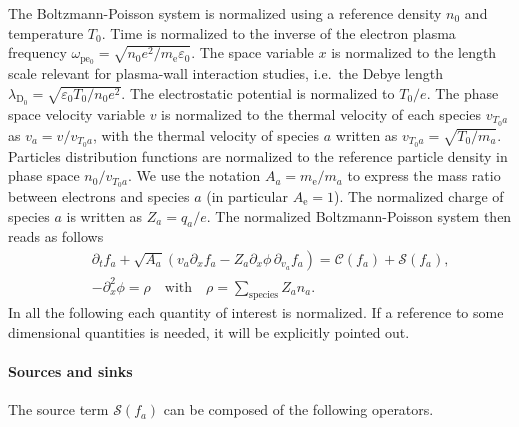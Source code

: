 \documentclass[11pt]{article}
\begin{document}
\noindent The Boltzmann-Poisson system is normalized using a reference density $n_0$ and temperature $T_0$. Time is normalized to the inverse of the electron plasma frequency $\omega_{\mathrm{pe_0}} = \sqrt{n_0 e^2 / m_\mathrm{e}\varepsilon_0} $. The space variable $x$ is normalized to the length scale relevant for plasma-wall interaction studies, i.e.\ the Debye length $\lambda_{\mathrm{D}_0} = \sqrt{\varepsilon_0 T_0 / n_0 e^2} $. The electrostatic potential is normalized to $T_0 / e$. The phase space velocity variable $v$ is normalized to the thermal velocity of each species $v_{T_0a}$ as $v_a = v/v_{T_0 a}$, with the thermal velocity of species $a$ written as $v_{T_0a} =  \sqrt{T_0/m_a}$. Particles distribution functions are normalized to the reference particle density in phase space $n_0 / v_{T_0a}$. We use the notation $A_a = m_\mathrm{e} / m_a$ to express the mass ratio between electrons and species $a$ (in particular $A_\mathrm{e} = 1$). The normalized charge of species $a$ is written as  $Z_a = q_a / e$. The normalized Boltzmann-Poisson system then reads as follows
%
\begin{eqnarray}
  && \partial_{t} f_a + \sqrt{A_a} \left( v_a \partial_{x} f_a \right. - \left. Z_a \partial_{x} \phi \, \partial_{v_a} f_a \right)   = \mathcal{C}(f_a) + \mathcal{S}(f_a), \label{eq:boltzmann_norm} \\[0.2cm]
  && -\partial_{x}^2 \phi = \rho \quad \text{with} \quad \rho = \sum\limits_{\mathrm{species}}^{} Z_a n_a. \label{eq:poisson_norm}
\end{eqnarray}
%
In all the following each quantity of interest is normalized. If a reference to some dimensional quantities is needed, it will be explicitly pointed out.
%
\paragraph{Sources and sinks} The source term $\mathcal{S}(f_a)$ can be composed of the following operators.
\end{document}
